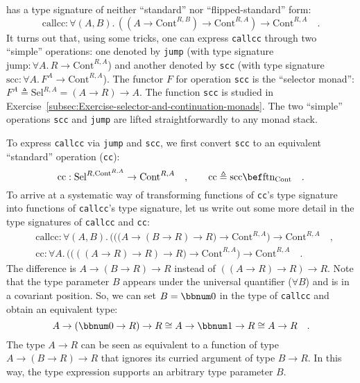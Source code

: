 has a type signature of neither \textsf{``}standard\textsf{''} nor \textsf{``}flipped-standard\textsf{''}
form:
\[
\text{callcc}:\forall(A,B).\,((A\rightarrow\text{Cont}^{R,B})\rightarrow\text{Cont}^{R,A})\rightarrow\text{Cont}^{R,A}\quad.
\]
It turns out that, using some tricks, one can express \lstinline!callcc!
through two \textsf{``}simple\textsf{''} operations: one denoted by \lstinline!jump!
(with type signature $\text{jump}:\forall A.\,R\rightarrow\text{Cont}^{R,A}$)
and another denoted by \lstinline!scc! (with type signature $\text{scc}:\forall A.\,F^{A}\rightarrow\text{Cont}^{R,A}$).
The functor $F$ for operation \lstinline!scc! is the \textsf{``}selector
monad\textsf{''}: $F^{A}\triangleq\text{Sel}^{R,A}=(A\rightarrow R)\rightarrow A$.
The function \lstinline!scc! is studied in Exercise~\ref{subsec:Exercise-selector-and-continuation-monads}.
The two \textsf{``}simple\textsf{''} operations \lstinline!scc! and \lstinline!jump!
are lifted straightforwardly to any monad stack. 

To express \lstinline!callcc! via \lstinline!jump! and \lstinline!scc!,
we first convert \lstinline!scc! to an equivalent \textsf{``}standard\textsf{''}
operation (\lstinline!cc!):
\[
\text{cc}:\text{Sel}^{R,\text{Cont}^{R,A}}\rightarrow\text{Cont}^{R,A}\quad,\quad\quad\text{cc}\triangleq\text{scc}\bef\text{ftn}_{\text{Cont}}\quad.
\]
To arrive at a systematic way of transforming functions of \lstinline!cc!\textsf{'}s
type signature into functions of \lstinline!callcc!\textsf{'}s type signature,
let us write out some more detail in the type signatures of \lstinline!callcc!
and \lstinline!cc!:
\begin{align*}
 & \text{callcc}:\forall(A,B).\,\big(\big((A\rightarrow(B\rightarrow R)\rightarrow R\big)\rightarrow\text{Cont}^{R,A}\big)\rightarrow\text{Cont}^{R,A}\quad,\\
 & \text{cc}:\forall A.\,\big(\big(((A\rightarrow R)\rightarrow R)\rightarrow R\big)\rightarrow\text{Cont}^{R,A}\big)\rightarrow\text{Cont}^{R,A}\quad.
\end{align*}
The difference is $A\rightarrow(B\rightarrow R)\rightarrow R$ instead
of $((A\rightarrow R)\rightarrow R)\rightarrow R$. Note that the
type parameter $B$ appears under the universal quantifier ($\forall B$)
and is in a covariant position. So, we can set $B=\bbnum 0$ in the
type of \lstinline!callcc! and obtain an equivalent type:
\[
A\rightarrow(\bbnum 0\rightarrow R)\rightarrow R\cong A\rightarrow\bbnum 1\rightarrow R\cong A\rightarrow R\quad.
\]
The type $A\rightarrow R$ can be seen as equivalent to a function
of type $A\rightarrow(B\rightarrow R)\rightarrow R$ that ignores
its curried argument of type $B\rightarrow R$. In this way, the type
expression supports an arbitrary type parameter $B$.

